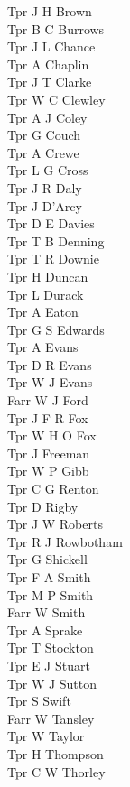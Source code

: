 \begin{multicols}{2}
  Tpr J H Brown \\
  Tpr B C Burrows \\
  Tpr J L Chance \\
  Tpr A Chaplin \\
  Tpr J T Clarke \\
  Tpr W C Clewley \\
  Tpr A J Coley \\
  Tpr G Couch \\
  Tpr A Crewe \\
  Tpr L G Cross \\
  Tpr J R Daly \\
  Tpr J D'Arcy \\
  Tpr D E Davies \\
  Tpr T B Denning \\
  Tpr T R Downie \\
  Tpr H Duncan \\
  Tpr L Durack \\
  Tpr A Eaton \\
  Tpr G S Edwards \\
  Tpr A Evans \\
  Tpr D R Evans \\
  Tpr W J Evans \\
  Farr W J Ford \\
  Tpr J F R Fox \\
  Tpr W H O Fox \\
  Tpr J Freeman \\
  Tpr W P Gibb \\
  Tpr C G Renton \\
  Tpr D Rigby \\
  Tpr J W Roberts \\
  Tpr R J Rowbotham \\
  Tpr G Shickell \\
  Tpr F A Smith \\
  Tpr M P Smith \\
  Farr W Smith \\
  Tpr A Sprake \\
  Tpr T Stockton \\
  Tpr E J Stuart \\
  Tpr W J Sutton \\
  Tpr S Swift \\
  Farr W Tansley \\
  Tpr W Taylor \\
  Tpr H Thompson \\
  Tpr C W Thorley \\

\end{multicols}
